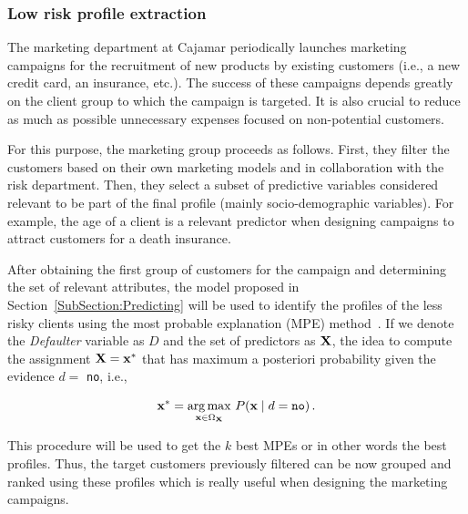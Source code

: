 \subsubsection{Low risk profile extraction} \label{subsubsec:profileExtraction}

The marketing department at Cajamar periodically launches marketing campaigns for the recruitment of new products by existing customers (i.e., a new credit card, an insurance, etc.). The success of these campaigns depends greatly on the client group to which the campaign is targeted. It is also crucial to reduce as much as possible unnecessary expenses focused on non-potential customers. 

For this purpose, the marketing group proceeds as follows. First, they filter the customers based on their own marketing models and in collaboration with the risk department. Then, they select a subset of predictive variables considered relevant to be part of the final profile (mainly socio-demographic variables). For example, the age of a client is a relevant predictor when designing campaigns to attract customers for a death insurance. 

After obtaining the first group of customers for the campaign and determining the set of relevant attributes, the model proposed in Section~\ref{SubSection:Predicting} will be used to identify the profiles of the less risky clients using the most probable explanation (MPE) method~\cite{pearl1988probabilistic}. If we denote the \emph{Defaulter} variable as $D$ and  the set of predictors as $\mathbf{X}$, the idea to compute the assignment $\mathbf{X} = \mathbf{x}^{*}$ that has maximum a posteriori probability given the evidence $d=$ \texttt{no}, i.e., 

\begin{equation}
\mathbf{x}^{*} = \underset{\mathbf{x}\in\Omega_{\mathbf{X}}} {\mathrm{arg\,max}} ~ P(\mathbf{x}\mid d = \texttt{no})\, .
\label{eq:MPE}
\end{equation}

This procedure will be used to get the $k$ best MPEs or in other words the best profiles. Thus, the target customers previously filtered can be now grouped and ranked using these profiles which is really useful when designing the marketing campaigns.

